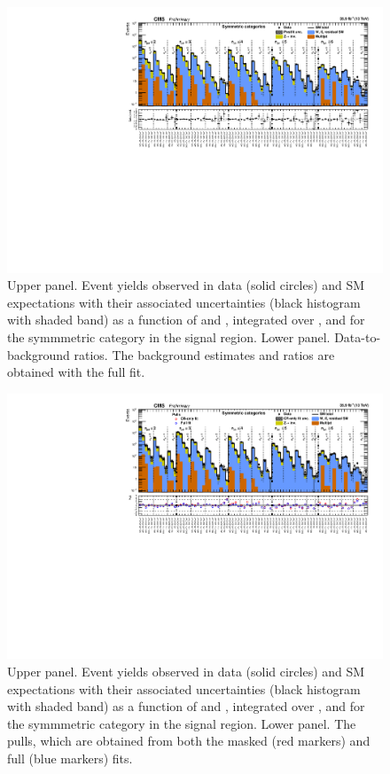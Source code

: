 \clearpage
\begin{figure}[h!]
  \centering
  \caption{Upper panel. Event yields observed in data (solid circles)
    and SM expectations with their associated uncertainties (black
    histogram with shaded band) as a function of \nb and \scalht,
    integrated over \mht, and for the symmmetric \njet category
    in the signal region. Lower panel. Data-to-background ratios. The
    background estimates and ratios are obtained with the full fit. }
  \label{fig:mr_symm_post}
  \includegraphics[width=1.\linewidth]{figures/results/36invfb/symm/summaryPlot_Symmetric_fit_b}
\end{figure}

\clearpage
\begin{figure}[h!]
  \centering
  \caption{Upper panel. Event yields observed in data (solid circles)
    and SM expectations with their associated uncertainties (black
    histogram with shaded band) as a function of \nb and \scalht,
    integrated over \mht, and for the symmmetric \njet category
    in the signal region. Lower panel. The pulls, which are obtained
    from both the masked (red markers) and full (blue markers) fits. }
  \label{fig:mr_symm_pulls}
  \includegraphics[width=1.\linewidth]{figures/results/36invfb/symm/summaryPlot_Symmetric_prefit_overlay_fit_b}
\end{figure}

